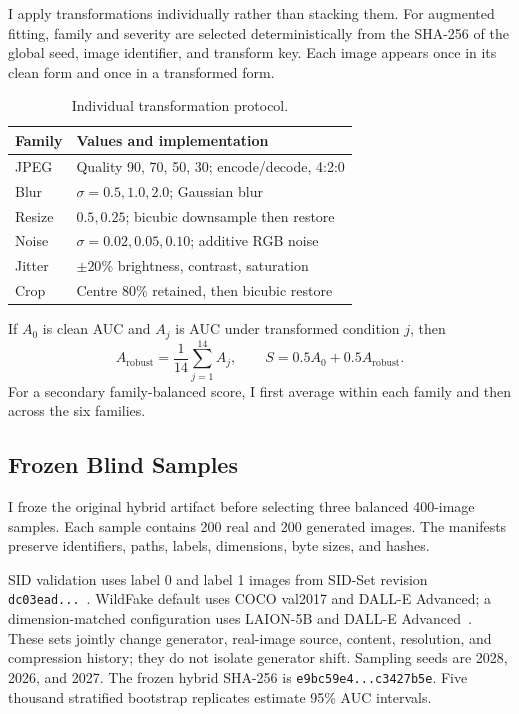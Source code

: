 \documentclass[10pt,twocolumn]{article}
\newcommand{\code}[1]{\texttt{#1}}
\begin{document}
I apply transformations individually rather than stacking them. For augmented fitting, family and
severity are selected deterministically from the SHA-256 of the global seed, image identifier, and
transform key. Each image appears once in its clean form and once in a transformed form.

\begin{table}[t]
\centering
\caption{Individual transformation protocol.}
\label{tab:transforms}
\small
\begin{tabularx}{\columnwidth}{@{}lX@{}}
\toprule
Family & Values and implementation \\
\midrule
JPEG & Quality 90, 70, 50, 30; encode/decode, 4:2:0 \\
Blur & $\sigma=0.5,1.0,2.0$; Gaussian blur \\
Resize & $0.5,0.25$; bicubic downsample then restore \\
Noise & $\sigma=0.02,0.05,0.10$; additive RGB noise \\
Jitter & $\pm20\%$ brightness, contrast, saturation \\
Crop & Centre 80\% retained, then bicubic restore \\
\bottomrule
\end{tabularx}
\end{table}

If $A_0$ is clean AUC and $A_j$ is AUC under transformed condition $j$, then
\begin{equation}
 A_{\mathrm{robust}}=\frac{1}{14}\sum_{j=1}^{14}A_j,
 \qquad S=0.5A_0+0.5A_{\mathrm{robust}}.
\end{equation}
For a secondary family-balanced score, I first average within each family and then across the six
families.

\subsection{Frozen Blind Samples}

I froze the original hybrid artifact before selecting three balanced 400-image samples. Each sample
contains 200 real and 200 generated images. The manifests preserve identifiers, paths, labels,
dimensions, byte sizes, and hashes.

SID validation uses label 0 and label 1 images from SID-Set revision \code{dc03ead...}~\cite{sidset}.
WildFake default uses COCO val2017 and DALL-E Advanced; a dimension-matched configuration uses
LAION-5B and DALL-E Advanced~\cite{wildfake}. These sets jointly change generator, real-image source,
content, resolution, and compression history; they do not isolate generator shift. Sampling seeds are
2028, 2026, and 2027. The frozen hybrid SHA-256 is
\code{e9bc59e4...c3427b5e}. Five thousand stratified bootstrap replicates estimate 95\% AUC intervals.
\end{document}
